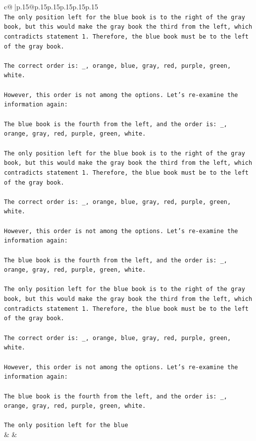 \documentclass{article}
\begin{document}
{\begin{supertabular}{c@{$\;$}|p{.15\linewidth}@{}p{.15\linewidth}p{.15\linewidth}p{.15\linewidth}p{.15\linewidth}p{.15\linewidth}}
{{{\\ 
\texttt{The only position left for the blue book is to the right of the gray book, but this would make the gray book the third from the left, which contradicts statement 1. Therefore, the blue book must be to the left of the gray book.} \\
\\ 
\texttt{The correct order is: \_, orange, blue, gray, red, purple, green, white.} \\
\\ 
\texttt{However, this order is not among the options. Let's re{-}examine the information again:} \\
\\ 
\texttt{The blue book is the fourth from the left, and the order is: \_, orange, gray, red, purple, green, white.} \\
\\ 
\texttt{The only position left for the blue book is to the right of the gray book, but this would make the gray book the third from the left, which contradicts statement 1. Therefore, the blue book must be to the left of the gray book.} \\
\\ 
\texttt{The correct order is: \_, orange, blue, gray, red, purple, green, white.} \\
\\ 
\texttt{However, this order is not among the options. Let's re{-}examine the information again:} \\
\\ 
\texttt{The blue book is the fourth from the left, and the order is: \_, orange, gray, red, purple, green, white.} \\
\\ 
\texttt{The only position left for the blue book is to the right of the gray book, but this would make the gray book the third from the left, which contradicts statement 1. Therefore, the blue book must be to the left of the gray book.} \\
\\ 
\texttt{The correct order is: \_, orange, blue, gray, red, purple, green, white.} \\
\\ 
\texttt{However, this order is not among the options. Let's re{-}examine the information again:} \\
\\ 
\texttt{The blue book is the fourth from the left, and the order is: \_, orange, gray, red, purple, green, white.} \\
\\ 
\texttt{The only position left for the blue} \\
            }
        }
    }
    & & \\ \\


\end{supertabular}}
\end{document}
